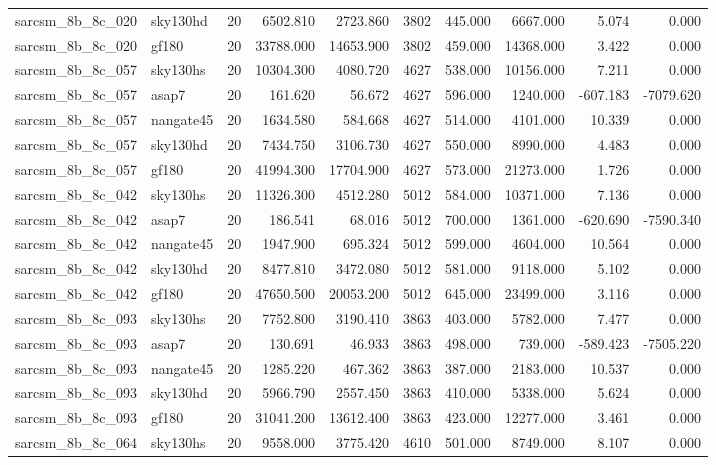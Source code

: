 \begin{longtable}{llrrrrrrrr}
sarcsm\_8b\_8c\_020 & sky130hd & 20 & 6502.810 & 2723.860 & 3802 & 445.000 & 6667.000 & 5.074 & 0.000 \\
sarcsm\_8b\_8c\_020 & gf180 & 20 & 33788.000 & 14653.900 & 3802 & 459.000 & 14368.000 & 3.422 & 0.000 \\
sarcsm\_8b\_8c\_057 & sky130hs & 20 & 10304.300 & 4080.720 & 4627 & 538.000 & 10156.000 & 7.211 & 0.000 \\
sarcsm\_8b\_8c\_057 & asap7 & 20 & 161.620 & 56.672 & 4627 & 596.000 & 1240.000 & -607.183 & -7079.620 \\
sarcsm\_8b\_8c\_057 & nangate45 & 20 & 1634.580 & 584.668 & 4627 & 514.000 & 4101.000 & 10.339 & 0.000 \\
sarcsm\_8b\_8c\_057 & sky130hd & 20 & 7434.750 & 3106.730 & 4627 & 550.000 & 8990.000 & 4.483 & 0.000 \\
sarcsm\_8b\_8c\_057 & gf180 & 20 & 41994.300 & 17704.900 & 4627 & 573.000 & 21273.000 & 1.726 & 0.000 \\
sarcsm\_8b\_8c\_042 & sky130hs & 20 & 11326.300 & 4512.280 & 5012 & 584.000 & 10371.000 & 7.136 & 0.000 \\
sarcsm\_8b\_8c\_042 & asap7 & 20 & 186.541 & 68.016 & 5012 & 700.000 & 1361.000 & -620.690 & -7590.340 \\
sarcsm\_8b\_8c\_042 & nangate45 & 20 & 1947.900 & 695.324 & 5012 & 599.000 & 4604.000 & 10.564 & 0.000 \\
sarcsm\_8b\_8c\_042 & sky130hd & 20 & 8477.810 & 3472.080 & 5012 & 581.000 & 9118.000 & 5.102 & 0.000 \\
sarcsm\_8b\_8c\_042 & gf180 & 20 & 47650.500 & 20053.200 & 5012 & 645.000 & 23499.000 & 3.116 & 0.000 \\
sarcsm\_8b\_8c\_093 & sky130hs & 20 & 7752.800 & 3190.410 & 3863 & 403.000 & 5782.000 & 7.477 & 0.000 \\
sarcsm\_8b\_8c\_093 & asap7 & 20 & 130.691 & 46.933 & 3863 & 498.000 & 739.000 & -589.423 & -7505.220 \\
sarcsm\_8b\_8c\_093 & nangate45 & 20 & 1285.220 & 467.362 & 3863 & 387.000 & 2183.000 & 10.537 & 0.000 \\
sarcsm\_8b\_8c\_093 & sky130hd & 20 & 5966.790 & 2557.450 & 3863 & 410.000 & 5338.000 & 5.624 & 0.000 \\
sarcsm\_8b\_8c\_093 & gf180 & 20 & 31041.200 & 13612.400 & 3863 & 423.000 & 12277.000 & 3.461 & 0.000 \\
sarcsm\_8b\_8c\_064 & sky130hs & 20 & 9558.000 & 3775.420 & 4610 & 501.000 & 8749.000 & 8.107 & 0.000 \\

\end{longtable}
